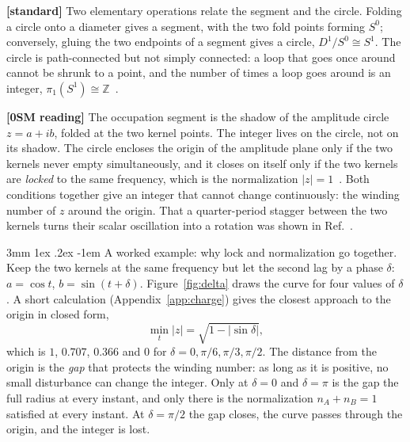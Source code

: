 \documentclass[%
 reprint, amsmath,amssymb, aps, prb, ]{revtex4-2}
\makeatletter
\numberwithin{equation}{section}
\renewcommand\paragraph{%
  \@startsection{paragraph}{4}{\z@}%
    {3mm \@plus 1ex \@minus .2ex}%
    {-1em}%
    {\normalfont\normalsize\itshape}}
\makeatother
\begin{document}
\textbf{[standard]} Two elementary operations relate the segment and the circle. Folding a circle onto a diameter gives a segment, with the two fold points forming $S^0$; conversely, gluing the two endpoints of a segment gives a circle, $D^1/S^0\cong S^1$. The circle is path-connected but not simply connected: a loop that goes once around cannot be shrunk to a point, and the number of times a loop goes around is an integer, $\pi_1(S^1)\cong\mathbb{Z}$~\cite{ref:hatcher,ref:nakahara}.

\textbf{[0SM reading]} The occupation segment is the shadow of the amplitude circle $z=a+ib$, folded at the two kernel points. The integer lives on the circle, not on its shadow. The circle encloses the origin of the amplitude plane only if the two kernels never empty simultaneously, and it closes on itself only if the two kernels are \emph{locked} to the same frequency, which is the normalization $|z|=1$~\cite{ref:p1,ref:p20}. Both conditions together give an integer that cannot change continuously: the winding number of $z$ around the origin. That a quarter-period stagger between the two kernels turns their scalar oscillation into a rotation was shown in Ref.~\cite{ref:p50}.

\paragraph{A worked example: why lock and normalization go together.} Keep the two kernels at the same frequency but let the second lag by a phase $\delta$: $a=\cos t$, $b=\sin(t+\delta)$. Figure~\ref{fig:delta} draws the curve for four values of $\delta$. A short calculation (Appendix~\ref{app:charge}) gives the closest approach to the origin in closed form,
\begin{equation}
\min_t|z|=\sqrt{1-|\sin\delta|},
\label{eq:gap}
\end{equation}
which is $1$, $0.707$, $0.366$ and $0$ for $\delta=0,\pi/6,\pi/3,\pi/2$. The distance from the origin is the \emph{gap} that protects the winding number: as long as it is positive, no small disturbance can change the integer. Only at $\delta=0$ and $\delta=\pi$ is the gap the full radius at every instant, and only there is the normalization $n_A+n_B=1$ satisfied at every instant. At $\delta=\pi/2$ the gap closes, the curve passes through the origin, and the integer is lost.
\end{document}
